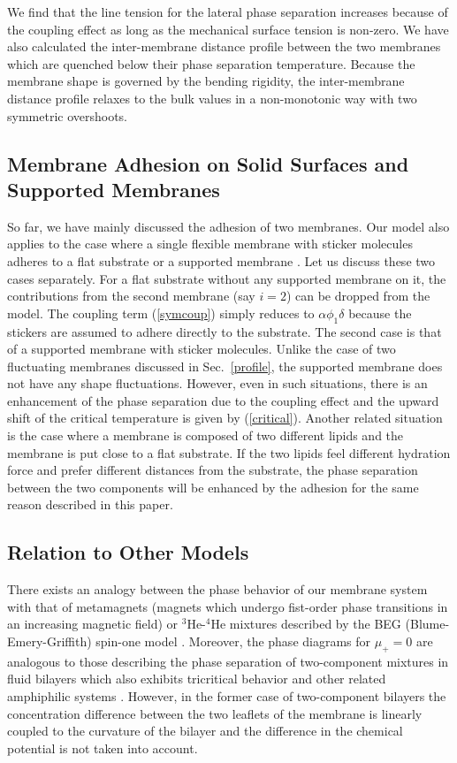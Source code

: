 We find that the line tension for the lateral phase separation
increases because of the coupling effect as long as the mechanical
surface tension is non-zero.
We have also calculated the inter-membrane distance profile
between the two membranes which are quenched below their phase
separation temperature.
Because the membrane shape is governed by the
bending rigidity, the inter-membrane distance profile relaxes to
the bulk values in a non-monotonic way with two symmetric overshoots.


\subsection{Membrane Adhesion on Solid Surfaces and Supported Membranes}


So far, we have mainly discussed the adhesion of two membranes.
Our model also applies to the case where a single flexible membrane
with sticker molecules adheres to a flat substrate or a supported
membrane \cite{RFSS}.
Let us discuss these two cases separately.
For a flat substrate without any supported membrane on it, the
contributions from the second membrane (say $i=2$) can be dropped
from the model.
The coupling term (\ref{symcoup}) simply reduces to
$\alpha \phi_1 \delta$ because
the stickers are assumed to adhere directly to the substrate.
The second case is that of a supported membrane with sticker molecules.
Unlike the case of two fluctuating membranes discussed in 
Sec.\ \ref{profile}, the supported membrane does not have any
shape fluctuations. However,
even in such situations, there is an enhancement of the phase
separation due to the coupling effect and the upward shift of the
critical temperature is given by (\ref{critical}).
Another related situation is the case where a membrane is
composed of two different lipids and the membrane is put close to a
flat substrate.
If the two lipids feel different hydration force and prefer different
distances from the substrate, the phase separation between the two
components will be enhanced by the adhesion for the same reason
described in this paper.


\subsection{Relation to Other Models}


There exists an analogy between the phase behavior of our membrane system
with that of metamagnets (magnets which undergo fist-order phase
transitions in an increasing magnetic field) or $^3$He-$^4$He mixtures
described by the BEG (Blume-Emery-Griffith) spin-one
model \cite{BEG,KC}.
Moreover, the phase diagrams for $\mu_+=0$ are analogous to those
describing the phase separation of two-component mixtures in fluid
bilayers which also exhibits tricritical behavior \cite{MacS}
and other related amphiphilic systems \cite{LA,KK,HM,HMI,VA}.
However, in the former case of two-component bilayers
the concentration difference between the
two leaflets of the membrane is linearly coupled to the curvature of
the bilayer and the difference in the chemical potential is not taken
into account.



